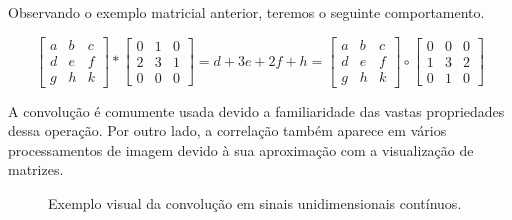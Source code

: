 Observando o exemplo matricial anterior, teremos o seguinte comportamento.

\begin{equation} \label{eq:corrconv}
    \begin{bmatrix}
        a & b & c \\
        d & e & f \\
        g & h & k
    \end{bmatrix} \ast \begin{bmatrix}
        0 & 1 & 0 \\
        2 & 3 & 1 \\
        0 & 0 & 0
    \end{bmatrix}
    = d + 3e + 2f + h =
    \begin{bmatrix}
        a & b & c \\
        d & e & f \\
        g & h & k
    \end{bmatrix} \circ \begin{bmatrix}
        0 & 0 & 0 \\
        1 & 3 & 2 \\
        0 & 1 & 0
    \end{bmatrix}
\end{equation}

A convolução é comumente usada devido a familiaridade das vastas propriedades dessa operação. Por outro lado, a correlação também aparece em vários processamentos de imagem devido à sua aproximação com a visualização de matrizes.

\begin{figure}[H]
    \centering
    \def\svgwidth{12cm}
    

    \caption{Exemplo visual da convolução em sinais unidimensionais contínuos.}
    \label{fig:convolucao-sinal}
\end{figure}
